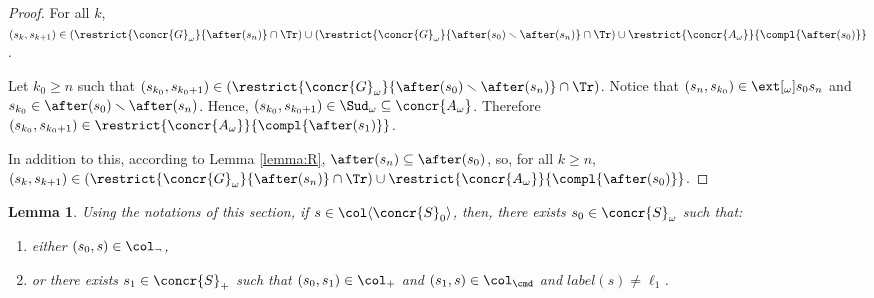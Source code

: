 \documentclass[12pt]{article}
\let\firstunion\cup
\let\firstinter\cap
\let\cup\firstunion
\let\cap\firstinter
\renewcommand{\subset}{\subseteq}
\newcommand{\lbl}{\mathit{label}}
\newtheorem{lemma}{Lemma}
\begin{document}
\begin{proof}
For all \(k\), 
 \((s_k,s_{k+1})\in
 (\restrict{{\concr{G}_{\omega}}}{\after(s_n)}\cap\Tr)\cup (\restrict{{\concr{G}_{\omega}}}{\after(s_0)\smallsetminus\after(s_n)}\cap\Tr)\cup\restrict{\concr{A_{\omega}}}{\compl{\after(s_0)}}\).
 
 Let \(k_0\geqslant n\) such that \((s_{k_0},s_{k_0+1})\in
 (\restrict{{\concr{G}_{\omega}}}{\after(s_0)\smallsetminus\after(s_n)}\cap\Tr)\).
 Notice that \((s_n,s_{k_0})\in\ext[_{\omega}]{s_0}{s_n}\) and \(s_{k_0}\in \after(s_0)\smallsetminus\after(s_n)\).
 Hence, \((s_{k_0},s_{k_0+1}) \in \Sud_{\omega}\subset \concr{A_{\omega}}\).
 Therefore \((s_{k_0},s_{k_0+1}) \in \restrict{\concr{A_{\omega}}}{\compl{\after(s_1)}}\).
 
 In addition to this, according to Lemma \ref{lemma:R}, \(\after(s_n)\subset\after(s_0)\), so, for all \(k\geqslant n\), 
 \((s_k,s_{k+1})\in
 (\restrict{{\concr{G}_{\omega}}}{\after(s_n)}\cap\Tr)\cup\restrict{\concr{A_{\omega}}}{\compl{\after(s_0)}}\).
 \end{proof}

\begin{lemma}\label{lemma:Cw}
 Using the notations of this section, if \(s\in\col\langle\concr{S}_{0}\rangle\), then, there exists \(s_0\in\concr{S}_{\omega}\) such that:
 \begin{enumerate}
\item either \((s_0,s)\in\col_{\neg}\),
  \item or there exists \(s_1\in\concr{S}_{+}\) such that \((s_0,s_1)\in\col_{+}\) and \((s_1,s)\in \col_{\cmd}\) and \(\lbl(s)\neq\ell_1\).
 \end{enumerate}
\end{lemma}
\end{document}
